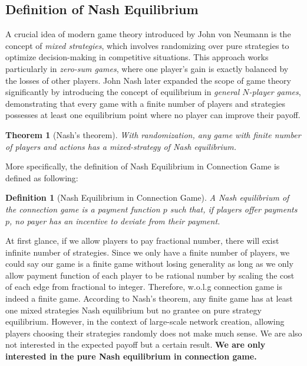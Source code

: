 \documentclass[11pt,psfig,times]{article}
\newtheorem{theorem}{Theorem}[section]
\newtheorem{definition}{Definition}[section]
\begin{document}
\subsection{Definition of Nash Equilibrium}
A crucial idea of modern game theory introduced by John von Neumann is the concept of \textit{mixed strategies}, which involves randomizing over pure strategies to optimize decision-making in competitive situations. This approach works particularly in \textit{zero-sum games}, where one player's gain is exactly balanced by the losses of other players. John Nash later expanded the scope of game theory significantly by introducing the concept of equilibrium in \textit{general \(N\)-player games}, demonstrating that every game with a finite number of players and strategies possesses at least one equilibrium point where no player can improve their payoff. 
\begin{theorem}[Nash's theorem]
	With randomization, any game with finite number of players and actions has a mixed-strategy of Nash equilibrium.
\end{theorem}
More specifically, the definition of Nash Equilibrium in Connection Game is defined as following:
\begin{definition}[Nash Equilibrium in Connection Game]
	A Nash equilibrium of the connection game is a payment function $p$ such that, if players offer payments \(p\), no payer has an incentive to deviate from their payment. 
\end{definition}
At first glance, if we allow players to pay fractional number, there will exist infinite number of strategies. Since we only have a finite number of players, we could say our game is a finite game without losing generality as long as we only allow payment function of each player to be rational number by scaling the cost of each edge from fractional to integer. Therefore, w.o.l.g connection game is indeed a finite game. According to Nash's theorem, any finite game has at least one mixed strategies Nash equilibrium but no grantee on pure strategy equilibrium. However, in the context of large-scale network creation, allowing players choosing their strategies randomly does not make much sense. We are also not interested in the expected payoff but a certain result.\textbf{ We are only interested in the pure Nash equilibrium in connection game.}
\end{document}
